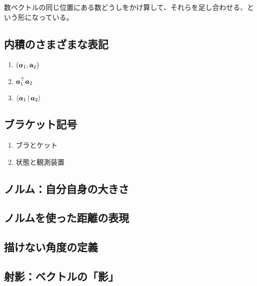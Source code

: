 \documentclass[../../imaging-math]{subfiles}
\begin{document}
数ベクトルの同じ位置にある数どうしをかけ算して、それらを足し合わせる、という形になっている。

\subsection{内積のさまざまな表記}

\begin{mindflow}
  \begin{enumerate}
    \item $(\vb*{a}_1, \vb{a}_2)$
    \item $\vb*{a}_1^\top \vb*{a}_2$
    \item $\Braket{\vb*{a}_1 | \vb*{a}_2}$
  \end{enumerate}
\end{mindflow}

\subsection{ブラケット記号}

\begin{mindflow}
  \begin{enumerate}
    \item ブラとケット
    \item 状態と観測装置
  \end{enumerate}
\end{mindflow}

\subsection{ノルム：自分自身の大きさ}

\subsection{ノルムを使った距離の表現}

\subsection{描けない角度の定義}

\subsection{射影：ベクトルの「影」}
\end{document}
